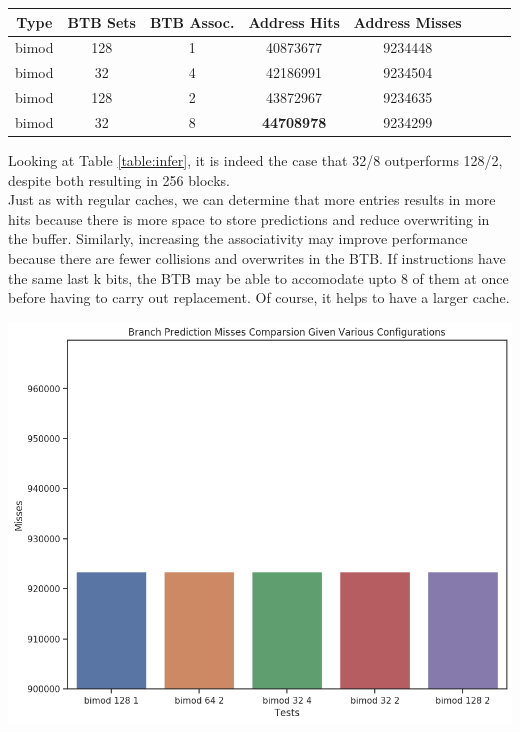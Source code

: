 \documentclass[twocolumn]{article}
\begin{document}
\begingroup
    \medskip
    \centering
    \def\arraystretch{1.5}
        \scriptsize{
        \begin{tabular}{cccccccc}
            \toprule
            Type & BTB Sets & BTB Assoc. & Address Hits & Address Misses\\
             \midrule
            bimod & 128 & 1 & 40873677 & 9234448\\
            bimod & 32 & 4 & 42186991 & 9234504\\
             \midrule
            bimod & 128 & 2 & 43872967 & 9234635\\
            bimod & 32 & 8 & \textbf{44708978} & 9234299\\
            \bottomrule
        \end{tabular}
        }
    \label{table:infer}
    \medskip
\endgroup

Looking at Table \ref{table:infer}, it is indeed the case that 32/8 outperforms 128/2, despite both resulting in 256 blocks.\\

Just as with regular caches, we can determine that more entries results in more hits because there is more space to store predictions and reduce overwriting in the buffer. Similarly, increasing the associativity may improve performance because there are fewer collisions and overwrites
in the BTB. If instructions have the same last k bits, the BTB may be able to accomodate upto 8 of them at once before having to carry out replacement. Of course, it helps to have a larger cache. 

\begingroup
    \centering
    \medskip
    \includegraphics[width=0.68\columnwidth]{Lab-Tex/Lab9-images/misses_bimod.png}
    \label{fig:misses_bimod}
    \medskip
\endgroup
\end{document}
